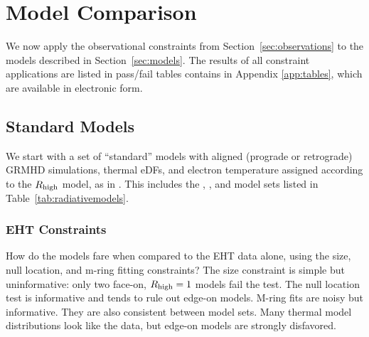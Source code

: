 \section{Model Comparison}\label{sec:comparisons}

We now apply the observational constraints from Section~\ref{sec:observations} to the models described in Section~\ref{sec:models}.  The results of all constraint applications are listed in pass/fail tables contains in Appendix \ref{app:tables}, which are available in electronic form.

\subsection{Standard Models}\label{subsec:thermal}


We start with a set of ``standard'' models with aligned (prograde or retrograde) GRMHD simulations, thermal eDFs, and electron temperature assigned according to the $R_\mathrm{high}$ model, as in .  This includes the \kharma, \bhac, and \hamr model sets listed in Table~\ref{tab:radiativemodels}.

\subsubsection{EHT Constraints}

How do the models fare when compared to the EHT data alone, using the size, null location, and m-ring fitting constraints?  The size constraint is simple but uninformative: only two face-on, $R_\mathrm{high} = 1$ models fail the test.  The null location test is informative and tends to rule out edge-on models. M-ring fits are noisy but informative.  They are also consistent between model sets.  Many thermal model distributions look like the data, but edge-on models are strongly disfavored.



